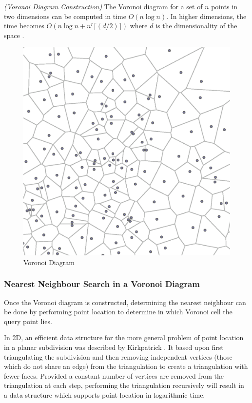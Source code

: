 \documentclass[mcs]{scsthesis}
\begin{document}
\begin{thm} \emph{(Voronoi Diagram Construction)}
The Voronoi diagram for a set of $n$ points in two dimensions can be computed
in time \(O(n \log n)\). In higher dimensions, the time becomes
\(O(n \log n + n^r{\lceil(d/2)\rceil})\) where $d$ is the dimensionality of the
space \cite{dutch}.
\end{thm}

\begin{figure}
\begin{center}
\includegraphics[scale=0.5]{diagrams/voronoi.eps}
\caption{Voronoi Diagram}
\end{center}
\end{figure}

\subsubsection{Nearest Neighbour Search in a Voronoi Diagram}

Once the Voronoi diagram is constructed, determining the nearest neighbour can
be done by performing point location to determine in which Voronoi cell the
query point lies.

In 2D, an efficient data structure for the more general problem of point
location in a planar subdivision was described by Kirkpatrick
\cite{kirkpatrick}. It based upon first triangulating the subdivision and then
removing independent vertices (those which do not share an edge) from the
triangulation to create a triangulation with fewer faces. Provided a constant
number of vertices are removed from the triangulation at each step, performing
the triangulation recursively will result in a data structure which supports
point location in logarithmic time.
\end{document}
